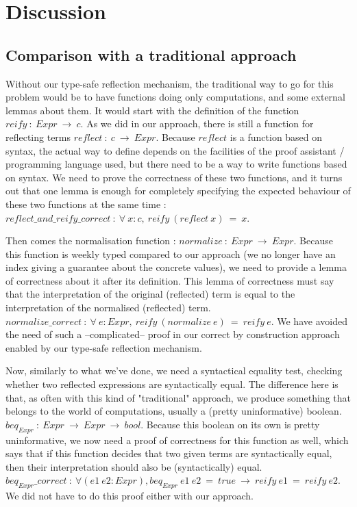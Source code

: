 \section {Discussion}


	\subsection{Comparison with a traditional approach}

Without our type-safe reflection mechanism, the traditional way to go for this problem would be to have functions doing only computations, and some external lemmas about them. It would start with the definition of the function $reify\ :\ Expr\ \rightarrow\ c$. As we did in our approach, there is still a function for reflecting terms $reflect\ :\ c\ \rightarrow\ Expr$. Because $reflect$ is a function based on syntax,  the actual way to define depends on the facilities of the proof assistant / programming language used, but there need to be a way to write functions based on syntax. We need to prove the correctness of these two functions, and it turns out that one lemma is enough for completely specifying the expected behaviour of these two functions at the same time : $reflect\_and\_reify\_correct\ :\ \forall\ x:c,\ reify\ (reflect\ x)\ =\ x$.

Then comes the normalisation function : $normalize\ :\ Expr\ \rightarrow\ Expr$. Because this function is weekly typed compared to our approach (we no longer have an index giving a guarantee about the concrete values), we need to provide a lemma of correctness about it after its definition. This lemma of correctness must say that the interpretation of the original (reflected) term is equal to the interpretation of the normalised (reflected) term. $normalize\_correct\ :\ \forall\ e:Expr,\ reify\ (normalize\ e)\ =\ reify\ e$. We have avoided the need of such a --complicated-- proof in our correct by construction approach enabled by our type-safe reflection mechanism.

Now, similarly to what we've done, we need a syntactical equality test, checking whether two reflected expressions are syntactically equal. The difference here is that, as often with this kind of "traditional" approach, we produce something that belongs to the world of computations, usually a (pretty uninformative) boolean.
$beq_{Expr}\ :\ Expr\ \rightarrow\ Expr\ \rightarrow\ bool$. Because this boolean on its own is pretty uninformative, we now need a proof of correctness for this function as well, which says that if this function decides that two given terms are syntactically equal, then their interpretation should also be (syntactically) equal. $beq_{Expr}\_correct\ :\ \forall (e1\ e2:Expr), beq_{Expr}\ e1\ e2\ =\ true\ \rightarrow\ reify\ e1\ =\ reify\ e2$. We did not have to do this proof either with our approach.

